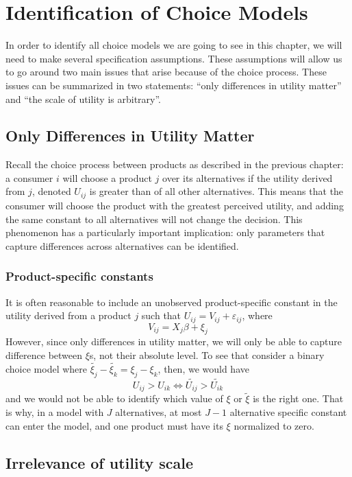 \section{Identification of Choice Models}

In order to identify all choice models we are going to see in this chapter, we will need to make several specification assumptions. These assumptions will allow us to go around two main issues that arise because of the choice process. These issues can be summarized in two statements: ``only differences in utility matter'' and ``the scale of utility is arbitrary''.

\subsection{Only Differences in Utility Matter}

Recall the choice process between products as described in the previous chapter: a consumer $i$ will choose a product $j$ over its alternatives if the utility derived from $j$, denoted $U_{ij}$ is greater than of all other alternatives. This means that the consumer will choose the product with the greatest perceived utility, and adding the same constant to all alternatives will not change the decision. This phenomenon has a particularly important implication: only parameters that capture differences across alternatives can be identified.

\subsubsection{Product-specific constants}

It is often reasonable to include an unobserved product-specific constant in the utility derived from a product $j$ such that $U_{ij} = V_{ij} + \varepsilon_{ij} $, where $$V_{ij} = X_j\beta + \xi_j $$ However, since only differences in utility matter, we will only be able to capture difference between $\xi$s, not their absolute level. To see that consider a binary choice model where $\tilde{\xi_{j}} - \tilde{\xi_{k}} = \xi_j - \xi_k$, then, we would have $$ U_{ij} > U_{ik} \Leftrightarrow \tilde{U_{ij}} > \tilde{U_{ik}} $$ and we would not be able to identify which value of $\xi$ or $\tilde{\xi}$ is the right one. That is why, in a model with $J$ alternatives, at most $J-1$ alternative specific constant can enter the model, and one product must have its $\xi$ normalized to zero.

\subsection{Irrelevance of utility scale}


